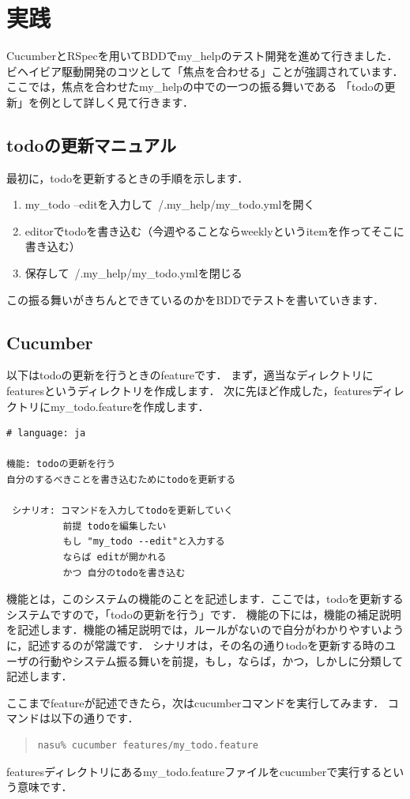 
\section{実践}
CucumberとRSpecを用いてBDDでmy\_helpのテスト開発を進めて行きました．
ビヘイビア駆動開発のコツとして「焦点を合わせる」ことが強調されています．
ここでは，焦点を合わせたmy\_helpの中での一つの振る舞いである
「todoの更新」を例として詳しく見て行きます．

\subsection{todoの更新マニュアル}
最初に，todoを更新するときの手順を示します．

\begin{enumerate}
\item my\_todo --editを入力して~/.my\_help/my\_todo.ymlを開く
\item editorでtodoを書き込む（今週やることならweeklyというitemを作ってそこに書き込む）
\item 保存して~/.my\_help/my\_todo.ymlを閉じる
\end{enumerate}
この振る舞いがきちんとできているのかをBDDでテストを書いていきます．

\subsection{Cucumber}
以下はtodoの更新を行うときのfeatureです．
まず，適当なディレクトリにfeaturesというディレクトリを作成します．
次に先ほど作成した，featuresディレクトリにmy\_todo.featureを作成します．
\begin{lstlisting}[style=customCsh,basicstyle={\scriptsize\ttfamily}]
# language: ja 

機能: todoの更新を行う
自分のするべきことを書き込むためにtodoを更新する

 シナリオ: コマンドを入力してtodoを更新していく
          前提 todoを編集したい
          もし "my_todo --edit"と入力する
          ならば editが開かれる
          かつ 自分のtodoを書き込む
\end{lstlisting}
機能とは，このシステムの機能のことを記述します．ここでは，todoを更新するシステムですので，「todoの更新を行う」です．
機能の下には，機能の補足説明を記述します．機能の補足説明では，ルールがないので自分がわかりやすいように，記述するのが常識です．
シナリオは，その名の通りtodoを更新する時のユーザの行動やシステム振る舞いを前提，もし，ならば，かつ，しかしに分類して記述します．

ここまでfeatureが記述できたら，次はcucumberコマンドを実行してみます．
コマンドは以下の通りです．
\begin{quote}\begin{verbatim}
nasu% cucumber features/my_todo.feature
\end{verbatim}\end{quote}
featuresディレクトリにあるmy\_todo.featureファイルをcucumberで実行するという意味です．

